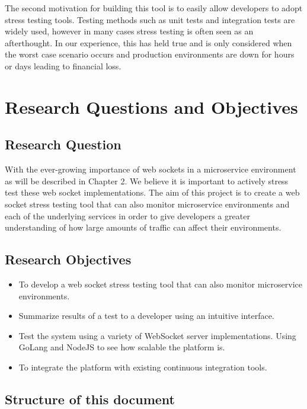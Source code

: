 The second motivation for building this tool is to easily allow developers to adopt stress testing tools. Testing methods such as unit tests and integration tests are widely used, however in many cases stress testing is often seen as an afterthought. In our experience, this has held true and is only considered when the worst case scenario occurs and production environments are down for hours or days leading to financial loss.

\section{Research Questions and Objectives}

\subsection{Research Question}

With the ever-growing importance of web sockets in a microservice environment as will be described in Chapter 2. We believe it is important to actively stress test these web socket implementations. The aim of this project is to create a web socket stress testing tool that can also monitor microservice environments and each of the underlying services in order to give developers a greater understanding of how large amounts of traffic can affect their environments.

\subsection{Research Objectives}

\begin{itemize}
  \item To develop a web socket stress testing tool that can also monitor microservice environments.
  \item Summarize results of a test to a developer using an intuitive interface.
  \item Test the system using a variety of WebSocket server implementations. Using GoLang and NodeJS to see how scalable the platform is.
  \item To integrate the platform with existing continuous integration tools.
\end{itemize}

\subsection{Structure of this document}

